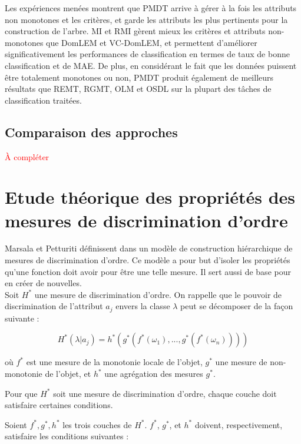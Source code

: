 \documentclass[a4paper]{article}
\begin{document}
Les expériences menées montrent que PMDT arrive à gérer à la fois les attributs
non monotones et les critères, et garde les attributs les plus pertinents pour
la construction de l'arbre. MI et RMI gèrent mieux les critères et attributs
non-monotones que DomLEM et VC-DomLEM, et permettent d'améliorer
significativement les performances de classification en termes de taux de bonne
classification et de MAE. De plus, en considérant le fait que les données
puissent être totalement monotones ou non, PMDT produit également de meilleurs
résultats que REMT, RGMT, OLM et OSDL sur la plupart des tâches de
classification traitées.

\subsection{Comparaison des approches}

\textcolor{red}{À compléter} %


\section{Etude théorique des propriétés des mesures de discrimination d'ordre}
Marsala et Petturiti définissent dans \cite{marsala-rank} un modèle de
construction hiérarchique de mesures de discrimination d'ordre. Ce modèle a pour
but d'isoler les propriétés qu'une fonction doit avoir pour être une telle
mesure. Il sert aussi de base pour en créer de nouvelles. \\

Soit $H^*$ une mesure de discrimination d'ordre. On rappelle que le pouvoir de
discrimination de l'attribut $a_j$ envers la classe $\lambda$ peut se décomposer
de la façon suivante :

$$ H^*(\lambda|a_j) = h^*(g^*(f^*(\omega_1),...,g^*(f^*(\omega_n))))$$

où $f^*$ est une mesure de la monotonie locale de l'objet, $g^*$ une mesure
de non-monotonie de l'objet, et $h^*$ une agrégation des mesures $g^*$.

Pour que $H^*$ soit une mesure de discrimination d'ordre, chaque couche doit
satisfaire certaines conditions.

Soient $f^*, g^*, h^*$ les trois couches de $H^*$. 
$f^*$, $g^*$, et $h^*$ doivent, respectivement, satisfaire les conditions suivantes :
\end{document}
